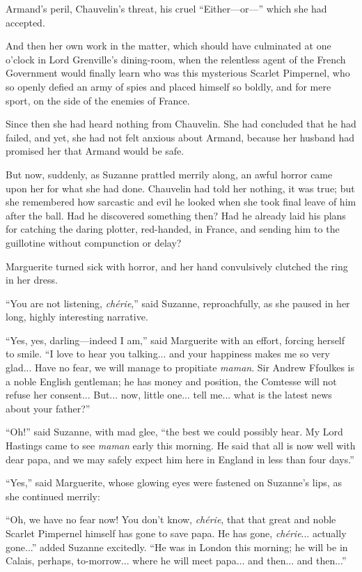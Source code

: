 \documentclass[paper=a5,BCOR=7mm,twoside,DIV=calc,12pt,usegeometry,chapterprefix,endperiod,headings=big]{scrbook}
\begin{document}
Armand's peril, Chauvelin's threat, his cruel \enquote{Either---or---} which she had accepted.

And then her own work in the matter, which should have culminated at one o'clock in Lord Grenville's dining-room, when the relentless agent of the French Government would finally learn who was this mysterious Scarlet Pimpernel, who so openly defied an army of spies and placed himself so boldly, and for mere sport, on the side of the enemies of France.

Since then she had heard nothing from Chauvelin. She had concluded that he had failed, and yet, she had not felt anxious about Armand, because her husband had promised her that Armand would be safe.

But now, suddenly, as Suzanne prattled merrily along, an awful horror came upon her for what she had done. Chauvelin had told her nothing, it was true; but she remembered how sarcastic and evil he looked when she took final leave of him after the ball. Had he discovered something then? Had he already laid his plans for catching the daring plotter, red-handed, in France, and sending him to the guillotine without compunction or delay?

Marguerite turned sick with horror, and her hand convulsively clutched the ring in her dress.

\enquote{You are not listening, \textit{chérie},} said Suzanne, reproachfully, as she paused in her long, highly interesting narrative.

\enquote{Yes, yes, darling---indeed I am,} said Marguerite with an effort, forcing herself to smile. \enquote{I love to hear you talking... and your happiness makes me so very glad... Have no fear, we will manage to propitiate \textit{maman}. Sir Andrew Ffoulkes is a noble English gentleman; he has money and position, the Comtesse will not refuse her consent... But... now, little one... tell me... what is the latest news about your father?}

\enquote{Oh!} said Suzanne, with mad glee, \enquote{the best we could possibly hear. My Lord Hastings came to see \textit{maman} early this morning. He said that all is now well with dear papa, and we may safely expect him here in England in less than four days.}

\enquote{Yes,} said Marguerite, whose glowing eyes were fastened on Suzanne's lips, as she continued merrily:

\enquote{Oh, we have no fear now! You don't know, \textit{chérie}, that that great and noble Scarlet Pimpernel himself has gone to save papa. He has gone, \textit{chérie}... actually gone...} added Suzanne excitedly. \enquote{He was in London this morning; he will be in Calais, perhaps, to-morrow... where he will meet papa... and then... and then...}
\end{document}
